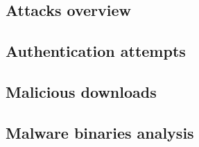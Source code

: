 \subsection{Attacks overview}

\paragraph{}

\subsection{Authentication attempts}

\paragraph{}

\subsection{Malicious downloads}

\paragraph{}

\subsection{Malware binaries analysis}

\paragraph{}